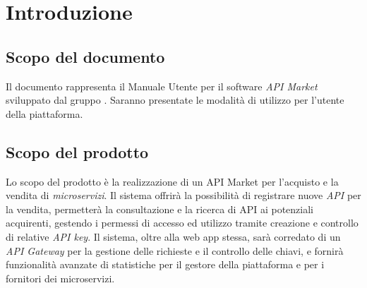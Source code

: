 \newpage
\section{Introduzione}

\subsection{Scopo del documento}
Il documento rappresenta il Manuale Utente per il software \textit{API Market} sviluppato dal gruppo \gruppo. Saranno presentate le modalità di utilizzo per l'utente della piattaforma.


\subsection{Scopo del prodotto}
Lo scopo del prodotto è la realizzazione di un API Market  per l'acquisto e la vendita di \textit{microservizi}. Il sistema offrirà la possibilità di registrare nuove \textit{API} per la vendita, permetterà la consultazione e la ricerca di API ai potenziali acquirenti, gestendo i permessi di accesso ed utilizzo tramite creazione e controllo di relative \textit{API key}. Il sistema, oltre alla web app stessa, sarà corredato di un \textit{API Gateway} per la gestione delle richieste e il controllo delle chiavi, e fornirà funzionalità avanzate di statistiche per il gestore della piattaforma e per i fornitori dei microservizi.
